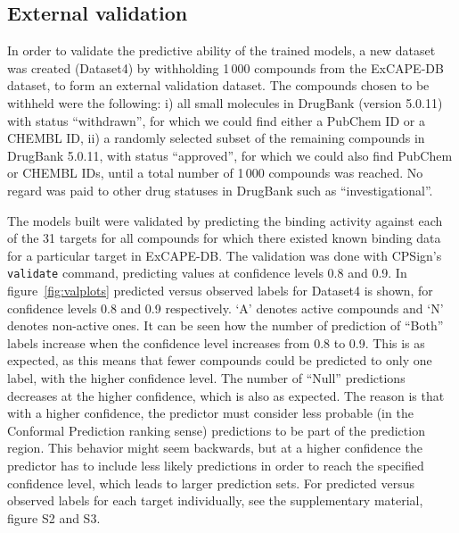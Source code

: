 \documentclass[utf8]{frontiersSCNS} %
\begin{document}
\subsection{External validation}

In order to validate the predictive ability of the trained models, a new
dataset was created (Dataset4) by withholding 1\,000 compounds from the
ExCAPE-DB dataset, to form an external validation dataset. The compounds chosen
to be withheld were the following: i) all small molecules in DrugBank (version
5.0.11) with status ``withdrawn'', for which we could find either a PubChem ID
or a CHEMBL ID, ii) a randomly selected subset of the remaining compounds in
DrugBank 5.0.11, with status ``approved'', for which we could also find PubChem
or CHEMBL IDs, until a total number of 1\,000 compounds was reached.  No regard
was paid to other drug statuses in DrugBank such as ``investigational''.

The models built were validated by predicting the binding activity against each
of the 31 targets for all compounds for which there existed known binding data
for a particular target in ExCAPE-DB. The validation was done with CPSign's
\texttt{validate} command, predicting values at confidence levels 0.8 and 0.9.
%
In figure~\ref{fig:valplots} predicted versus observed labels for Dataset4 is
shown, for confidence levels 0.8 and 0.9 respectively. `A' denotes active
compounds and `N' denotes non-active ones. It can be seen how the number
of prediction of ``Both'' labels increase when the confidence level increases
from 0.8 to 0.9. This is as expected, as this means that fewer compounds
could be predicted to only one label, with the higher confidence level. The
number of ``Null'' predictions decreases at the higher confidence, which is
also as expected. The reason is that with a higher confidence, the predictor
must consider less probable (in the Conformal Prediction ranking sense)
predictions to be part of the prediction region. This behavior might seem
backwards, but at a higher confidence the predictor has to include less
likely predictions in order to reach the specified confidence level, which
leads to larger prediction sets. For predicted versus observed labels for
each target individually, see the supplementary material, figure S2 and S3.
\end{document}
